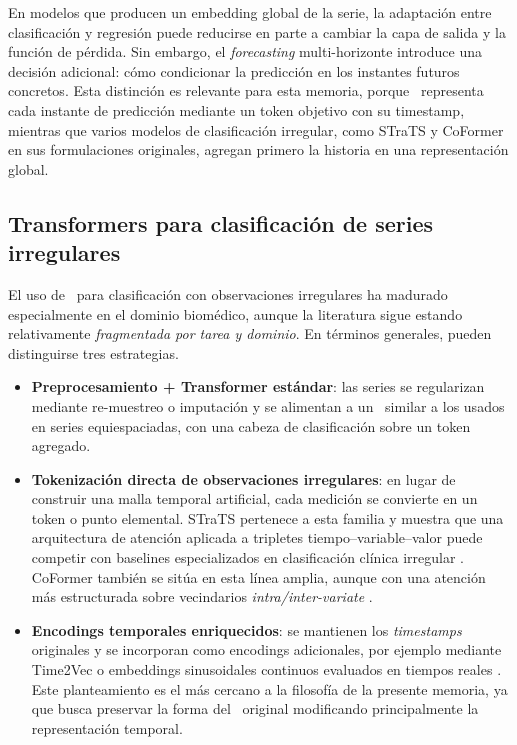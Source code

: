 En modelos que producen un embedding global de la serie, la adaptación entre clasificación y regresión puede reducirse en parte a cambiar la capa de salida y la función de pérdida. Sin embargo, el \textit{forecasting} multi-horizonte introduce una decisión adicional: cómo condicionar la predicción en los instantes futuros concretos. Esta distinción es relevante para esta memoria, porque \CTTransformer\ representa cada instante de predicción mediante un token objetivo con su timestamp, mientras que varios modelos de clasificación irregular, como STraTS y CoFormer en sus formulaciones originales, agregan primero la historia en una representación global.

\subsection{Transformers para clasificación de series irregulares}

El uso de \Transformers\ para clasificación con observaciones irregulares ha madurado especialmente en el dominio biomédico, aunque la literatura sigue estando relativamente \textit{fragmentada por tarea y dominio}. En términos generales, pueden distinguirse tres estrategias.

\begin{itemize}
    \item \textbf{Preprocesamiento + Transformer estándar}: las series se regularizan mediante re-muestreo o imputación y se alimentan a un \Transformer\ similar a los usados en series equiespaciadas, con una cabeza de clasificación sobre un token agregado.
    \item \textbf{Tokenización directa de observaciones irregulares}: en lugar de construir una malla temporal artificial, cada medición se convierte en un token o punto elemental. STraTS pertenece a esta familia y muestra que una arquitectura de atención aplicada a tripletes tiempo--variable--valor puede competir con baselines especializados en clasificación clínica irregular \cite{tipirneni2022strats}. CoFormer también se sitúa en esta línea amplia, aunque con una atención más estructurada sobre vecindarios \emph{intra/inter-variate} \cite{wei2023coformer}.
    \item \textbf{Encodings temporales enriquecidos}: se mantienen los \emph{timestamps} originales y se incorporan como encodings adicionales, por ejemplo mediante Time2Vec o embeddings sinusoidales continuos evaluados en tiempos reales \cite{kazemi2019time2vec}. Este planteamiento es el más cercano a la filosofía de la presente memoria, ya que busca preservar la forma del \Transformer\ original modificando principalmente la representación temporal.
\end{itemize}

